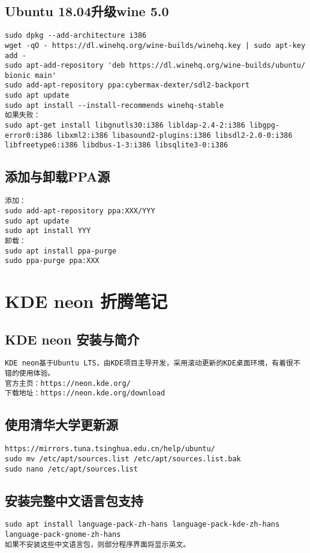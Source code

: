 \documentclass[a4paper,fontset=fandol,zihao=-4,linespread=1.2]{ctexbook}
\begin{document}
\section{Ubuntu 18.04升级wine 5.0}
\begin{lstlisting}
sudo dpkg --add-architecture i386
wget -qO - https://dl.winehq.org/wine-builds/winehq.key | sudo apt-key add -
sudo apt-add-repository 'deb https://dl.winehq.org/wine-builds/ubuntu/ bionic main'
sudo add-apt-repository ppa:cybermax-dexter/sdl2-backport
sudo apt update
sudo apt install --install-recommends winehq-stable
如果失败：
sudo apt-get install libgnutls30:i386 libldap-2.4-2:i386 libgpg-error0:i386 libxml2:i386 libasound2-plugins:i386 libsdl2-2.0-0:i386 libfreetype6:i386 libdbus-1-3:i386 libsqlite3-0:i386
\end{lstlisting}

\section{添加与卸载PPA源}
\begin{lstlisting}
添加：
sudo add-apt-repository ppa:XXX/YYY
sudo apt update
sudo apt install YYY
卸载：
sudo apt install ppa-purge
sudo ppa-purge ppa:XXX
\end{lstlisting}


\chapter{KDE neon 折腾笔记}

\section{KDE neon 安装与简介}
\begin{lstlisting}
KDE neon基于Ubuntu LTS，由KDE项目主导开发，采用滚动更新的KDE桌面环境，有着很不错的使用体验。
官方主页：https://neon.kde.org/
下载地址：https://neon.kde.org/download
\end{lstlisting}

\section{使用清华大学更新源}
\begin{lstlisting}
https://mirrors.tuna.tsinghua.edu.cn/help/ubuntu/
sudo mv /etc/apt/sources.list /etc/apt/sources.list.bak
sudo nano /etc/apt/sources.list
\end{lstlisting}

\section{安装完整中文语言包支持}
\begin{lstlisting}
sudo apt install language-pack-zh-hans language-pack-kde-zh-hans language-pack-gnome-zh-hans
如果不安装这些中文语言包，则部分程序界面将显示英文。
\end{lstlisting}
\end{document}

